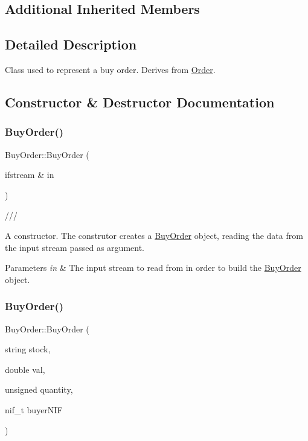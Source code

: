 \subsection*{Additional Inherited Members}


\subsection{Detailed Description}
Class used to represent a buy order. Derives from \hyperlink{class_order}{Order}. 

\subsection{Constructor \& Destructor Documentation}
\mbox{\label{class_buy_order_acbf093767d9d108b9448f2eefb5f58cd}} 
\subsubsection{\texorpdfstring{Buy\+Order()}{BuyOrder()}\hspace{0.1cm}{\footnotesize\ttfamily [1/2]}}
{\footnotesize\ttfamily Buy\+Order\+::\+Buy\+Order (\begin{DoxyParamCaption}\item[{ifstream \&}]{in }\end{DoxyParamCaption})}



/// 

A constructor. The construtor creates a \hyperlink{class_buy_order}{Buy\+Order} object, reading the data from the input stream passed as argument. 
\begin{DoxyParams}{Parameters}
{\em in} & The input stream to read from in order to build the \hyperlink{class_buy_order}{Buy\+Order} object. \\
\hline
\end{DoxyParams}
\mbox{\label{class_buy_order_a1fcd1c4a28acdf04bfdf99c5b16b4e7d}} 
\subsubsection{\texorpdfstring{Buy\+Order()}{BuyOrder()}\hspace{0.1cm}{\footnotesize\ttfamily [2/2]}}
{\footnotesize\ttfamily Buy\+Order\+::\+Buy\+Order (\begin{DoxyParamCaption}\item[{string}]{stock,  }\item[{double}]{val,  }\item[{unsigned}]{quantity,  }\item[{nif\+\_\+t}]{buyer\+N\+IF }\end{DoxyParamCaption})}

